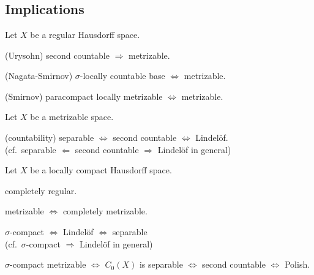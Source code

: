 \documentclass{../../large}
\begin{document}
\chapter{}
























\newpage
\section*{Implications}

\begin{prb}
Let $X$ be a regular Hausdorff space.
\begin{parts}
\item (Urysohn) second countable $\Rightarrow$ metrizable.
\item (Nagata-Smirnov) $\sigma$-locally countable base $\Leftrightarrow$ metrizable.
\item (Smirnov) paracompact locally metrizable $\Leftrightarrow$ metrizable.
\end{parts}
\end{prb}


\begin{prb}
Let $X$ be a metrizable space.
\begin{parts}
\item (countability) separable $\Leftrightarrow$ second countable $\Leftrightarrow$ Lindel\"of.\\
(cf.~separable $\Leftarrow$ second countable $\Rightarrow$ Lindel\"of in general)
\end{parts}
\end{prb}


\begin{prb}
Let $X$ be a locally compact Hausdorff space.
\begin{parts}
\item completely regular.
\item metrizable $\Leftrightarrow$ completely metrizable.
\item $\sigma$-compact $\Leftrightarrow$ Lindel\"of $\Leftrightarrow$ separable\\
(cf.~$\sigma$-compact $\Rightarrow$ Lindel\"of in general)
\item $\sigma$-compact metrizable $\Leftrightarrow$ $C_0(X)$ is separable $\Leftrightarrow$ second countable $\Leftrightarrow$ Polish.
\end{parts}
\end{prb}
\end{document}
